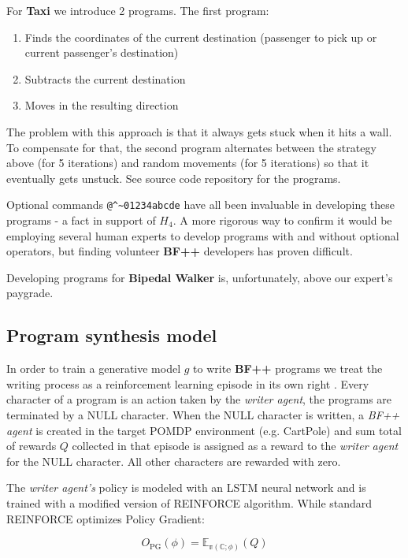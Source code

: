 For \textbf{Taxi} we introduce 2 programs.
The first program:
\begin{enumerate}
    \item Finds the coordinates of the current destination (passenger to pick up or current passenger's destination)
    \item Subtracts the current destination 
    \item Moves in the resulting direction
\end{enumerate}

The problem with this approach is that it always gets stuck when it hits a wall.
To compensate for that, the second program alternates between the strategy above (for 5 iterations) and random movements (for 5 iterations) so that it eventually gets unstuck. See source code repository for the programs.

Optional commands \verb|@^~01234abcde| have all been invaluable in developing these programs - a fact in support of $H_4$.
A more rigorous way to confirm it would be employing several human experts to develop programs with and without optional operators, but finding volunteer \textbf{BF++} developers has proven difficult. 

Developing programs for \textbf{Bipedal Walker} is, unfortunately, above our expert's paygrade. 

\subsection{Program synthesis model}
\label{sec:methodology}

In order to train a generative model $g$ to write \textbf{BF++} programs we treat the writing process as a reinforcement learning episode in its own right \cite{brain-coder} .
Every character of a program is an action taken by the \emph{writer agent}, the programs are terminated by a NULL character.
When the NULL character is written, a \emph{BF++ agent} is created in the target POMDP environment (e.g. CartPole) and sum total of rewards $Q$ collected in that episode is assigned as a reward to the \emph{writer agent} for the NULL character.
All other characters are rewarded with zero.

The \emph{writer agent's} policy is modeled with an LSTM \cite{lstm} neural network and is trained with a modified version of REINFORCE \cite{reinforce} algorithm.
While standard REINFORCE optimizes Policy Gradient:

\begin{equation}
    O_{\text{PG}}(\phi) = \mathbb{E_{\pi(C; \phi)}}(Q)
\end{equation}


